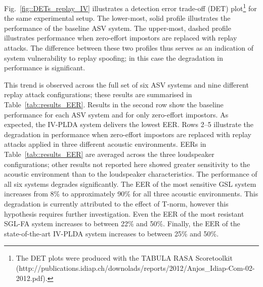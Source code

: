 Fig.~\ref{fig::DETs_replay_IV} illustrates a detection error trade-off (DET) plot\footnote{The DET plots were produced with the TABULA RASA Scoretoolkit (http://publications.idiap.ch/downolads/reports/2012/Anjos\_Idiap-Com-02-2012.pdf).} for the same experimental setup.  The lower-most, solid profile illustrates the performance of the baseline ASV system.  The upper-most, dashed profile illustrates performance when zero-effort impostors are replaced with replay attacks.  The difference between these two profiles thus serves as an indication of system vulnerability to replay spoofing; in this case the degradation in performance is significant.  



This trend is observed across the full set of six ASV systems and nine different replay attack configurations;  
these results are summarised in Table~\ref{tab::results_EER}.
Results in the second row show the baseline performance for each ASV system and for only zero-effort impostors.
As expected, the IV-PLDA system delivers the lowest EER.
Rows 2--5 illustrate the degradation in performance when zero-effort impostors are replaced with replay attacks applied in three different acoustic environments.
EERs in Table~\ref{tab::results_EER} are averaged across the three loudspeaker configurations; other results not reported here showed greater sensitivity to the acoustic environment than to the loudspeaker characteristics.  
The performance of all six systems degrades significantly.
The EER of the most sensitive GSL system increases from 8\% to approximately 90\% for all three acoustic environments. This degradation is currently attributed to the effect of T-norm, however this hypothesis requires further investigation.
Even the EER of the most resistant SGL-FA system increases to between 22\% and 50\%.  
Finally, the EER of the state-of-the-art IV-PLDA system increases to between 25\% and 50\%.  %


